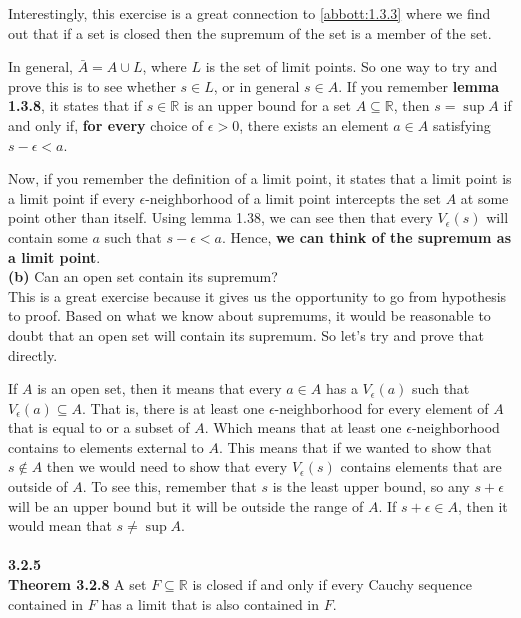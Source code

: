 Interestingly, this exercise is a great connection to \ref{abbott:1.3.3} where we find out that if a set is closed
then the supremum of the set is a member of the set.

In general, $\bar{A} = A \cup L$, where $L$ is the set of limit points.
So one way to try and prove this is to see whether $s \in L$, or in general $s \in A$.
If you remember \textbf{lemma 1.3.8},
it states that if $s \in \mathbb{R}$ is an upper bound for a set $A \subseteq \mathbb{R}$,
then $s = \sup A$ if and only if, \textbf{for every} choice of $\epsilon > 0$,
there exists an element $a \in A$ satisfying $s - \epsilon < a$.

Now, if you remember the definition of a limit point, it states that a limit point is a limit point
if every $\epsilon$-neighborhood of a limit point intercepts the set $A$ at some point other than itself.
Using lemma 1.38, we can see then that every $V_\epsilon (s)$ will contain some $a$ such that $s - \epsilon < a$.
Hence, \textbf{we can think of the supremum as a limit point}.
\\

\textbf{(b)} Can an open set contain its supremum?
\\

This is a great exercise because it gives us the opportunity to go from hypothesis to proof.
Based on what we know about supremums, it would be reasonable to doubt that an open set will contain its supremum.
So let's try and prove that directly.

If $A$ is an open set, then it means that every $a \in A$ has a $V_\epsilon (a)$ such that $V_{\epsilon} (a) \subseteq A$.
That is, there is at least one $\epsilon$-neighborhood for every element of $A$ that is equal to or a subset of $A$.
Which means that at least one $\epsilon$-neighborhood contains to elements external to $A$.
This means that if we wanted to show that $s \not\in A$ then we would need to show that every $V_\epsilon (s)$
contains elements that are outside of $A$.
To see this, remember that $s$ is the least upper bound, so any $s+\epsilon$ will be an upper bound but it will be
outside the range of $A$.
If $s+\epsilon \in A$, then it would mean that $s \neq \sup A$.
\\~\\




\textbf{3.2.5}
\\

\textbf{Theorem 3.2.8} A set $F \subseteq \mathbb{R}$ is closed if and only if every
Cauchy sequence contained in $F$ has a limit that is also contained in $F$.
\\

